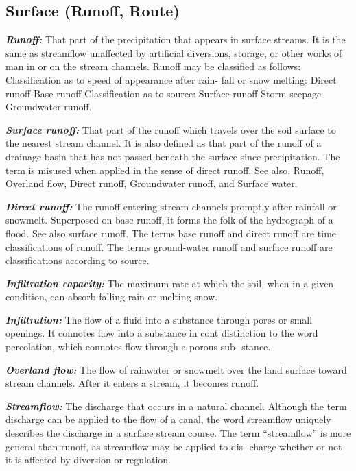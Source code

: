 \documentclass[
]{book}
\begin{document}
\hypertarget{Surface1}{%
\subsection{Surface (Runoff, Route)}\label{Surface1}}

\textbf{\emph{Runoff:}} That part of the precipitation that appears in surface streams. It is the same as streamflow unaffected by artificial diversions, storage, or other works of man in or on the stream channels. Runoff may be classified as follows: Classification as to speed of appearance after rain- fall or snow melting: Direct runoff Base runoff Classification as to source: Surface runoff Storm seepage Groundwater runoff.

\textbf{\emph{Surface runoff:}} That part of the runoff which travels over the soil surface to the nearest stream channel. It is also defined as that part of the runoff of a drainage basin that has not passed beneath the surface since precipitation. The term is misused when applied in the sense of direct runoff. See also, Runoff, Overland flow, Direct runoff, Groundwater runoff, and Surface water.

\textbf{\emph{Direct runoff:}} The runoff entering stream channels promptly after rainfall or snowmelt. Superposed on base runoff, it forms the folk of the hydrograph of a flood. See also surface runoff. The terms base runoff and direct runoff are time classifications of runoff. The terms ground-water runoff and surface runoff are classifications according to source.\citep{LANGBEIN.1960}

\textbf{\emph{Infiltration capacity:}} The maximum rate at which the soil, when in a given condition, can absorb falling rain or melting snow.\citep{Horton.1933}

\textbf{\emph{Infiltration:}} The flow of a fluid into a substance through pores or small openings. It connotes flow into a substance in cont distinction to the word percolation, which connotes flow through a porous sub- stance.\citep{Horton.1941}

\textbf{\emph{Overland flow:}} The flow of rainwater or snowmelt over the land surface toward stream channels. After it enters a stream, it becomes runoff.\citep{LANGBEIN.1960}

\textbf{\emph{Streamflow:}} The discharge that occurs in a natural channel. Although the term discharge can be applied to the flow of a canal, the word streamflow uniquely describes the discharge in a surface stream course. The term ``streamflow'' is more general than runoff, as streamflow may be applied to dis- charge whether or not it is affected by diversion or regulation.\citep{LANGBEIN.1960}
\end{document}
